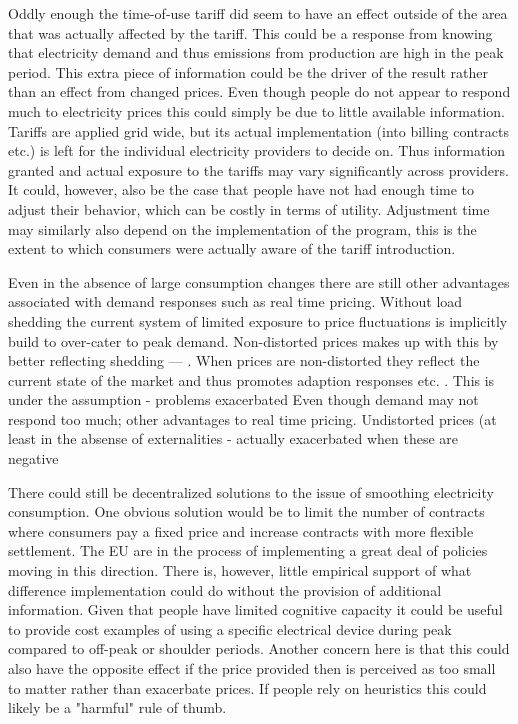 Oddly enough the time-of-use tariff did seem to have an effect outside of the area that was actually affected by the tariff. This could be a response from knowing that electricity demand and thus emissions from production are high in the peak period. This extra piece of information could be the driver of the result rather than an effect from changed prices. Even though people do not appear to respond much to electricity prices this could simply be due to little available information. Tariffs are applied grid wide, but its actual implementation (into billing contracts etc.) is left for the individual electricity providers to decide on. Thus information granted and actual exposure to the tariffs may vary significantly across providers. It could, however, also be the case that people have not had enough time to adjust their behavior, which can be costly in terms of utility. Adjustment time may similarly also depend on the implementation of the program, this is the extent to which consumers were actually aware of the tariff introduction.
\bigskip

Even in the absence of large consumption changes there are still other advantages associated with demand responses such as real time pricing. Without load shedding the current system of limited exposure to price fluctuations is implicitly build to over-cater to peak demand. Non-distorted prices makes up with this by better reflecting  shedding  --- . When prices are non-distorted they reflect the current state of the market and thus promotes adaption responses etc. .  This is under the assumption - problems exacerbated Even though demand may not respond too much; other advantages to real time pricing. Undistorted prices (at least in the absense of externalities - actually exacerbated when these are negative 


There could still be decentralized solutions to the issue of smoothing electricity consumption. One obvious solution would be to limit the number of contracts where consumers pay a fixed price and increase contracts with more flexible settlement. The EU are in the process of implementing a great deal of policies moving in this direction. There is, however, little empirical support of what difference implementation could do without the provision of additional information. Given that people have limited cognitive capacity it could be useful to provide cost examples of using a specific electrical device during peak compared to off-peak or shoulder periods.
Another concern here is that this could also have the opposite effect if the price provided then is perceived as too small to matter rather than exacerbate prices. If people rely on heuristics this could likely be a "harmful" rule of thumb.
\bigskip

